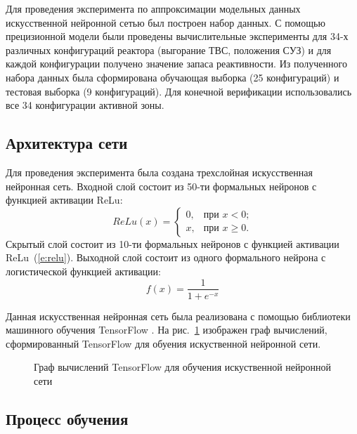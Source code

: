 Для проведения эксперимента по аппроксимации модельных данных искусственной нейронной сетью был построен набор данных.
С помощью прецизионной модели были проведены вычислительные эксперименты для 34-х различных конфигураций реактора (выгорание ТВС, положения СУЗ) и для каждой конфигурации получено значение запаса реактивности.
Из полученного набора данных была сформирована обучающая выборка (25 конфигураций) и тестовая выборка (9 конфигураций).
Для конечной верификации использовались все 34 конфигурации активной зоны.

\subsection{Архитектура сети}\label{nn-arch}

Для проведения эксперимента была создана трехслойная искусственная
нейронная сеть. Входной слой состоит из 50-ти формальных нейронов с
функцией активации ReLu:
\begin{equation}
    \label{e:relu}
    ReLu(x)=
    \begin{cases}
        0, & \text{при $x<0$;} \\
        x, & \text{при $x\ge0$.}
    \end{cases}
\end{equation}
Скрытый слой состоит из 10-ти формальных нейронов с функцией активации ReLu~(\ref{e:relu}).
Выходной слой состоит из одного формального нейрона с
логистической функцией активации:
\begin{equation}
    \label{e:logist}
    f(x)=\frac{1}{1+e^{-x}}
\end{equation}

Данная искусственная нейронная сеть была реализована с помощью библиотеки машинного обучения TensorFlow \cite{tensorflow2015-whitepaper,gs-tensorflow-2016,tenosrflow-2017}.
На рис.~\ref{pic:tf-graph} изображен граф вычислений, сформированный TensorFlow для обуения искуственной нейронной сети.

\begin{figure}[p]
    \caption[Граф вычислений TensorFlow]{Граф вычислений TensorFlow для обучения искуственной нейронной сети}
    \label{pic:tf-graph}
\end{figure}

\subsection{Процесс обучения}


